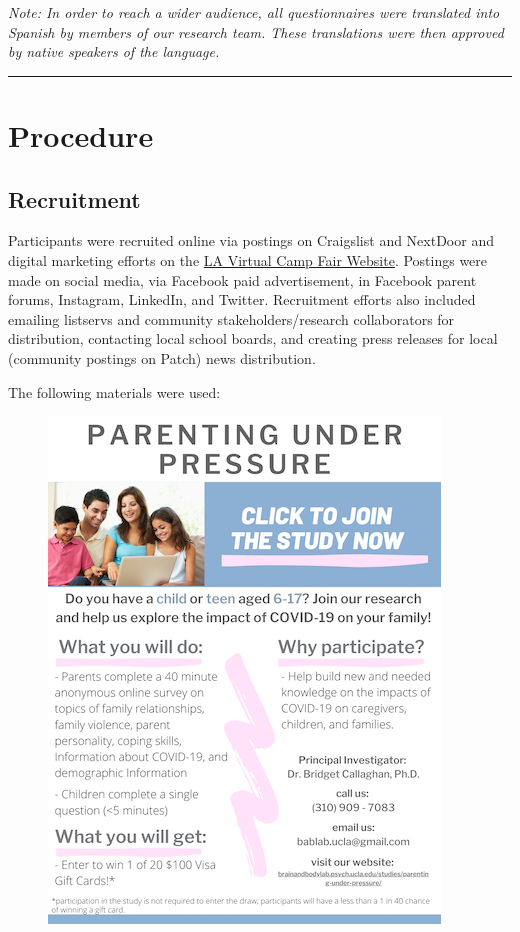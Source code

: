 \documentclass[]{book}
\begin{document}
\emph{Note: In order to reach a wider audience, all questionnaires were translated into Spanish by members of our research team. These translations were then approved by native speakers of the language.}

\begin{center}\rule{0.5\linewidth}{0.5pt}\end{center}

\hypertarget{procedure}{%
\section{Procedure}\label{procedure}}

\hypertarget{recruitment}{%
\subsection{Recruitment}\label{recruitment}}

Participants were recruited online via postings on Craigslist and NextDoor and digital marketing efforts on the \href{https://www.vcampfair.com/brain-and-body-lab-ucla.html}{LA Virtual Camp Fair Website}. Postings were made on social media, via Facebook paid advertisement, in Facebook parent forums, Instagram, LinkedIn, and Twitter. Recruitment efforts also included emailing listservs and community stakeholders/research collaborators for distribution, contacting local school boards, and creating press releases for local (community postings on Patch) news distribution.

The following materials were used:

\begin{figure}
\centering
\includegraphics{images/PUP_flyer.png}
\caption{}
\end{figure}
\end{document}

